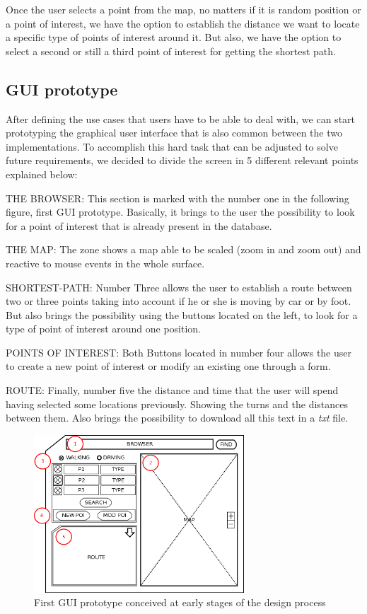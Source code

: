 \documentclass{article}
\begin{document}
Once the user selects a point from the map, no matters if it is random position or a point of interest, we have the option to establish the distance we want to locate a specific type of points of interest around it. But also, we have the option to select a second or still a third point of interest for getting the shortest path.

\subsection{GUI prototype}
After defining the use cases that users have to be able to deal with, we can start prototyping the graphical user interface that is also common between the two implementations. To accomplish this hard task that can be adjusted to solve future requirements, we decided to divide the screen in 5 different relevant points explained below:

THE BROWSER: This section is marked with the number one in the following figure, first GUI prototype. Basically, it brings to the user the possibility to look for a point of interest that is already present in the database.

THE MAP: The zone shows a map able to be scaled (zoom in and zoom out) and reactive to mouse events in the whole surface.

SHORTEST-PATH: Number Three allows the user to establish a route between two or three points taking into account if he or she is moving by car or by foot. But also brings the possibility using the buttons located on the left, to look for a type of point of interest around one position.

POINTS OF INTEREST: Both Buttons located in number four allows the user to create a new point of interest or modify an existing one through a form.

ROUTE: Finally, number five the distance and time that the user will spend having selected some locations previously. Showing the turns and the distances between them. Also brings the possibility to download all this text in a \textit{txt} file.

\begin{figure}[h]
\centering
\includegraphics[width=0.7\textwidth]{Prototype.png}
\caption{First GUI prototype conceived at early stages of the design process}
\label{fig:GUIprototype}
\end{figure}
\end{document}

